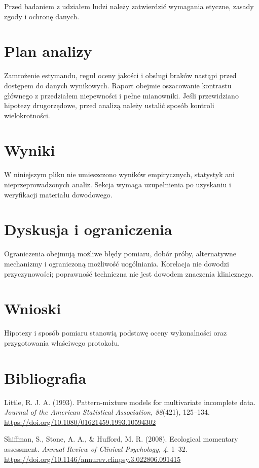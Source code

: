 \documentclass[11pt,a4paper]{article}
\begin{document}
Przed badaniem z udziałem ludzi należy zatwierdzić wymagania etyczne, zasady zgody i ochronę danych.

\section{Plan analizy}

Zamrożenie estymandu, reguł oceny jakości i obsługi braków nastąpi przed dostępem do danych wynikowych. Raport obejmie oszacowanie kontrastu głównego z przedziałem niepewności i pełne mianowniki. Jeśli przewidziano hipotezy drugorzędowe, przed analizą należy ustalić sposób kontroli wielokrotności.

\section{Wyniki}

W niniejszym pliku nie umieszczono wyników empirycznych, statystyk ani nieprzeprowadzonych analiz. Sekcja wymaga uzupełnienia po uzyskaniu i weryfikacji materiału dowodowego.

\section{Dyskusja i ograniczenia}

Ograniczenia obejmują możliwe błędy pomiaru, dobór próby, alternatywne mechanizmy i ograniczoną możliwość uogólniania. Korelacja nie dowodzi przyczynowości; poprawność techniczna nie jest dowodem znaczenia klinicznego.

\section{Wnioski}

Hipotezy i sposób pomiaru stanowią podstawę oceny wykonalności oraz przygotowania właściwego protokołu.

\section*{Bibliografia}

{\setlength{\parindent}{0pt}
\setlength{\parskip}{5pt}
\hangindent=1.27cm
Little, R. J. A. (1993). Pattern-mixture models for multivariate incomplete data. \textit{Journal of the American Statistical Association, 88}(421), 125--134. \url{https://doi.org/10.1080/01621459.1993.10594302}\par
\hangindent=1.27cm
Shiffman, S., Stone, A. A., \& Hufford, M. R. (2008). Ecological momentary assessment. \textit{Annual Review of Clinical Psychology, 4}, 1--32. \url{https://doi.org/10.1146/annurev.clinpsy.3.022806.091415}\par
}
\end{document}
